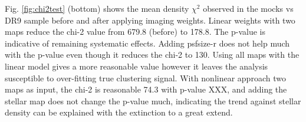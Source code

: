 Fig. \ref{fig:chi2test} (bottom) shows the mean density $\chi^{2}$ observed in the mocks vs DR9 sample before and after applying imaging weights. Linear weights with two maps reduce the chi-2 value from 679.8 (before) to 178.8. The p-value is indicative of remaining systematic effects. Adding psfsize-r does not help much with the p-value even though it reduces the chi-2 to 130. Using all maps with the linear model gives a more reasonable value however it leaves the analysis susceptible to over-fitting true clustering signal. With nonlinear approach two maps as input, the chi-2 is reasonable 74.3 with p-value XXX, and adding the stellar map does not change the p-value much, indicating the trend against stellar density can be explained with the extinction to a great extend. 


